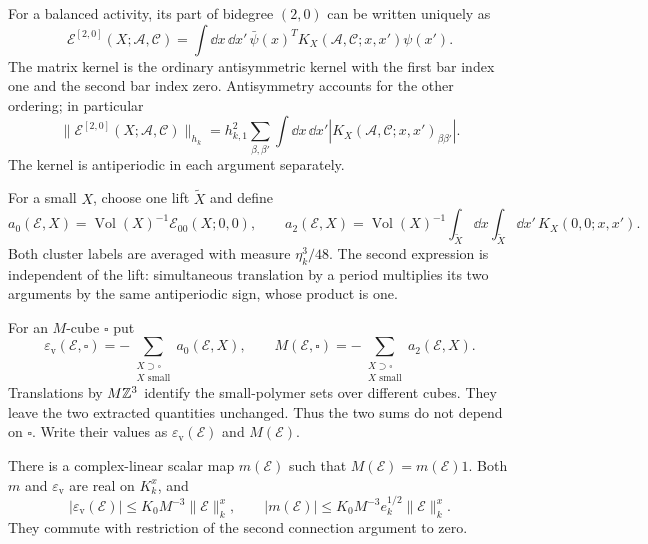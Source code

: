 For a balanced activity, its part of bidegree $(2,0)$ can be
written uniquely as
\[
 \mathscr E^{[2,0]}(X;\mathscr A,\mathscr C)
   =\int\dd x\,\dd x'\,
             \bar\psi(x)^T K_X(\mathscr A,\mathscr C;x,x')\psi(x').
\]
The matrix kernel is the ordinary antisymmetric kernel with
the first bar index one and the second bar index zero.
Antisymmetry accounts for the other ordering; in particular
\begin{equation}\label{eq:rg-bilinear-norm}
 \|\mathscr E^{[2,0]}(X;\mathscr A,\mathscr C)\|_{h_k}
   =h_{k,1}^2\sum_{\beta,\beta'}\int\dd x\,\dd x'
                     |K_X(\mathscr A,\mathscr C;x,x')_{\beta\beta'}|.
\end{equation}
The kernel is antiperiodic in each argument separately.

For a small $X$, choose one lift $\widetilde X$ and define
\begin{equation}\label{eq:rg-local-extractions}
 a_0(\mathscr E,X)
       =\operatorname{Vol}(X)^{-1}\mathscr E_{00}(X;0,0),\qquad
 a_2(\mathscr E,X)
       =\operatorname{Vol}(X)^{-1}
             \int_{\widetilde X}\dd x\int_{\widetilde X}\dd x'\,
                                                    K_X(0,0;x,x').
\end{equation}
Both cluster labels are averaged with measure $\eta_k^3/48$.
The second expression is independent of the lift: simultaneous
translation by a period multiplies its two arguments by the
same antiperiodic sign, whose product is one.

For an $M$-cube $\square$ put
\begin{equation}\label{eq:rg-counterterm-maps}
 \varepsilon_{\mathrm v}(\mathscr E,\square)
          =-\sum_{\substack{X\supset\square\\X\text{ small}}}
                                                     a_0(\mathscr E,X),
 \qquad
 M(\mathscr E,\square)
          =-\sum_{\substack{X\supset\square\\X\text{ small}}}
                                                     a_2(\mathscr E,X).
\end{equation}
Translations by $M\mathbb Z^3$ identify the small-polymer sets over
different cubes. They leave the two extracted quantities
unchanged. Thus the two sums do not depend on $\square$.
Write their values as $\varepsilon_{\mathrm v}(\mathscr E)$ and
$M(\mathscr E)$.

\begin{proposition}\label{prop:rg-scalar-counterterms}
There is a complex-linear scalar map $m(\mathscr E)$ such that
$M(\mathscr E)=m(\mathscr E)1$. Both $m$ and
$\varepsilon_{\mathrm v}$ are real on $K_k^x$, and
\begin{equation}\label{eq:rg-counterterm-bounds}
 |\varepsilon_{\mathrm v}(\mathscr E)|
                  \le K_0M^{-3}\|\mathscr E\|_k^x,
 \qquad
 |m(\mathscr E)|\le K_0M^{-3}e_k^{1/2}\|\mathscr E\|_k^x.
\end{equation}
They commute with restriction of the second connection argument
to zero.
\end{proposition}

